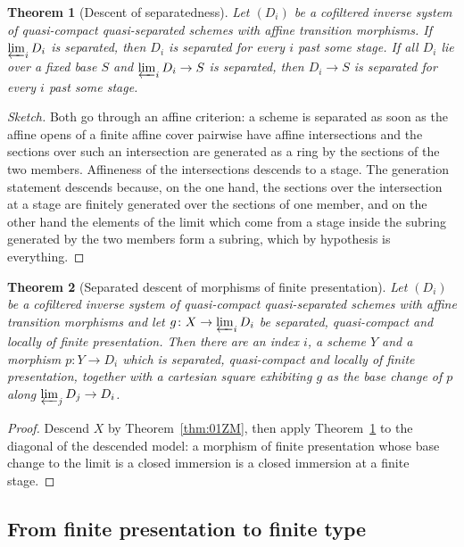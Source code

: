 \documentclass[11pt,a4paper]{article}
\theoremstyle{plain}
\newtheorem{theorem}{Theorem}[section]
\theoremstyle{definition}
\theoremstyle{remark}
\newcommand{\qcqs}{quasi-compact quasi-separated}
\begin{document}
\begin{theorem}[Descent of separatedness]
\label{thm:086Q}
Let $(D_i)$ be a cofiltered inverse system of \qcqs{} schemes with affine
transition morphisms. If $\varprojlim_i D_i$ is separated, then $D_i$ is
separated for every $i$ past some stage. If all $D_i$ lie over a fixed base $S$
and $\varprojlim_i D_i\to S$ is separated, then $D_i\to S$ is separated for
every $i$ past some stage.
\end{theorem}

\begin{proof}[Sketch]
Both go through an affine criterion: a scheme is separated as soon as the affine
opens of a finite affine cover pairwise have affine intersections and the
sections over such an intersection are generated as a ring by the sections of
the two members. Affineness of the intersections descends to a stage. The
generation statement descends because, on the one hand, the sections over the
intersection at a stage are finitely generated over the sections of one member,
and on the other hand the elements of the limit which come from a stage inside
the subring generated by the two members form a subring, which by hypothesis is
everything.
\end{proof}

\begin{theorem}[Separated descent of morphisms of finite presentation]
\label{thm:01ZQ}
Let $(D_i)$ be a cofiltered inverse system of \qcqs{} schemes with affine
transition morphisms and let $g\colon X\to\varprojlim_i D_i$ be separated,
quasi-compact and locally of finite presentation. Then there are an index $i$, a
scheme $Y$ and a morphism $p\colon Y\to D_i$ which is separated, quasi-compact
and locally of finite presentation, together with a cartesian square exhibiting
$g$ as the base change of $p$ along $\varprojlim_j D_j\to D_i$.
\end{theorem}

\begin{proof}
Descend $X$ by Theorem~\ref{thm:01ZM}, then apply
Theorem~\ref{thm:086Q} to the diagonal of the descended model: a morphism of
finite presentation whose base change to the limit is a closed immersion is a
closed immersion at a finite stage.
\end{proof}

\subsection{From finite presentation to finite type}
\end{document}

